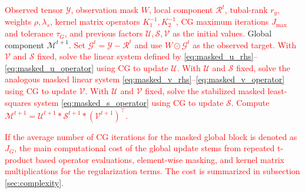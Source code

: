 \documentclass[a4paper,12pt]{article}
\numberwithin{equation}{section}
\numberwithin{algorithm}{section}
\newcommand{\rev}[1]{\textcolor{red}{#1}}
\theoremstyle{remark}
\theoremstyle{definition}
\begin{document}
\begin{algorithm}[!htbp]
	\caption{\textcolor{red}{Updating Global Factors with Observed-Position Fitting}}
	\label{alg:update_global}
	\begin{algorithmic}[1]
		\REQUIRE		
		\rev{Observed tensor $\mathcal{Y}$, observation mask $W$, local component $\mathcal{R}^{t}$, tubal-rank $r_g$, weights $\rho,\lambda_s$, kernel matrix operators $K_1^{-1},K_2^{-1}$, CG maximum iterations $J_{\max}$ and tolerance $\tau_G$, and previous factors $\mathcal{U},\mathcal{S},\mathcal{V}$ as the initial values.}
		\ENSURE Global component $\mathcal{M}^{t+1}$.		
		\STATE \rev{Set $\mathcal{G}^{t}=\mathcal{Y}-\mathcal{R}^{t}$ and use $W\odot\mathcal{G}^{t}$ as the observed target.}
		\STATE \rev{With $\mathcal{V}$ and $\mathcal{S}$ fixed, solve the linear system defined by \eqref{eq:masked_u_rhs}--\eqref{eq:masked_u_operator} using CG to update $\mathcal{U}$.}
		\STATE \rev{With $\mathcal{U}$ and $\mathcal{S}$ fixed, solve the analogous masked linear system \eqref{eq:masked_v_rhs}--\eqref{eq:masked_v_operator} using CG to update $\mathcal{V}$.}
		\STATE \rev{With $\mathcal{U}$ and $\mathcal{V}$ fixed, solve the stabilized masked least-squares system \eqref{eq:masked_s_operator} using CG to update $\mathcal{S}$.}
		\STATE \rev{Compute $\mathcal{M}^{t+1}=\mathcal{U}^{t+1}*\mathcal{S}^{t+1}*(\mathcal{V}^{t+1})^{\top}$.}
	\end{algorithmic}
\end{algorithm}



\rev{If the average number of CG iterations for the masked global block is denoted as $J_G$, the main computational cost of the global update stems from repeated t-product based operator evaluations, element-wise masking, and kernel matrix multiplications for the regularization terms. The cost is summarized in subsection \ref{sec:complexity}.}
\end{document}
